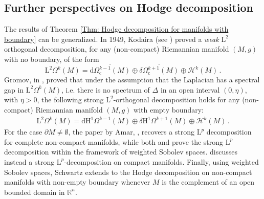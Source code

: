 \subsection{Further perspectives on Hodge decomposition}\label{Sec: weak-Hodge decomposition}
	The results of Theorem \ref{Thm: Hodge decomposition for manifolds with boundary} can be generalized.
	In 1949, Kodaira (see \parencite{Kodaira-49}) proved a \emph{weak} $\mathrm{L}^2$ orthogonal decomposition, for any (non-compact) Riemannian manifold $(M,g)$ with no boundary, of the form
	\begin{equation}
		\mathrm{L}^2\Omega^k(M)=\overline{\mathrm{d}\Omega_\mathrm{c}^{k-1}(M)}\oplus\overline{\delta \Omega_\mathrm{c}^{k+1}(M)}\oplus\mathcal{H}^k(M)\,.
	\end{equation}
	Gromov, in \parencite{Gromov-91}, proved that under the assumption that the Laplacian has a spectral gap in $\mathrm{L}^2\Omega^k(M)$, i.e. there is no spectrum of $\Delta$ in an open interval $(0, \eta)$, with $\eta>0$, the following strong $\mathrm{L}^2$-orthogonal decomposition holds for any (non-compact) Riemannian manifold $(M,g)$ with empty boundary:
	\begin{align}
	\mathrm{L}^2\Omega^k(M)=\mathrm{d}\mathrm{H}^1\Omega^{k-1}(M)\oplus\delta \mathrm{H}^1\Omega^{k+1}(M)\oplus\mathcal{H}^k(M)\,.
	\end{align}
	For the case $\partial M\neq \emptyset$, the paper by Amar, \parencite{Amar-17}, recovers a strong $\mathrm{L}^p$ decomposition for complete non-compact manifolds, while both \parencite{Li-09} and \parencite{Zulfikar-Stroock-00} prove the strong $\mathrm{L}^p$ decomposition within the framework of weighted Sobolev spaces. \parencite{Scott-95} discusses instead a strong $\mathrm{L}^p$-decomposition on compact manifolds. Finally, using weighted Sobolev spaces, Schwartz \parencite{Schwarz-95} extends to the Hodge decomposition on non-compact manifolds with non-empty boundary whenever $M$ is the complement of an open bounded domain in $\mathbb{R}^n$.
	
